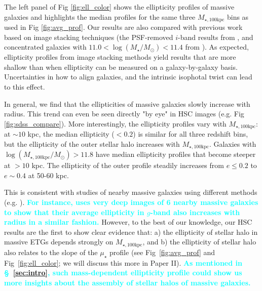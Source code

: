 \documentclass[a4paper,fleqn,usenatbib]{mnras}
\def\logms{{$\log (M_{\star}/M_{\odot})$}}
\def\mtot{{$M_{\star,100\mathrm{kpc}}$}}
\def\logmtot{{$\log (M_{\star,100\mathrm{kpc}}/M_{\odot})$}}
\def\mden{{$\mu_{\star}$}}
\newcommand{\song}[1]{\textcolor{cyan}{\textbf{#1}}}
\begin{document}
	The left panel of Fig \ref{fig:ell_color} shows the ellipticity profiles of 
	massive galaxies and highlights the median profiles for the same three \mtot{} 
	bins as used in Fig \ref{fig:avg_prof}.  
	Our results are also compared with previous work based on image stacking techniques 
	(the PSF-removed $i$-band results from \citealt{Tal2011}, and
    concentrated galaxies with $11.0<$\logms{}$<11.4$ from \citealt{DSouza2015}).
	As expected, ellipticity profiles from image stacking methods yield results that 
	are more shallow than when ellipticity can be measured on a galaxy-by-galaxy basis.     
	Uncertainties in how to align galaxies, and the intrinsic isophotal twist can 
	lead to this effect. 

	In general, we find that the ellipticities of massive galaxies slowly increase 
	with radius. 
	This trend can even be seen directly "by eye" in HSC images (e.g. 
	Fig \ref{fig:sdss_compare}). 
	More interestingly, the ellipticity profiles vary with \mtot{}: 
	at ${\sim} 10$ kpc, the median ellipticity ($< 0.2$) is similar for all three 
	redshift bins, but the ellipticity of the outer stellar halo increases with 
	\mtot{}. 
	Galaxies with \logmtot{}$>11.8$ have median ellipticity profiles that become 
	steeper at $>10$ kpc. 
	The ellipticity of the outer profile steadily increases from 
	$e\le 0.2$ to $e{\sim} 0.4$ at 50-60 kpc.
    
	This is consistent with studies of nearby massive galaxies using different
	methods (e.g. \citep{Porter1991, Gonzalez2005, Zibetti2005, Huang2013a, Oh2017}). 
	\song{
	For instance, \citet{Spavone2017} uses very deep images of 6 nearby massive 
	galaxies to show that their average ellipticity in $g$-band also increases with 
	radius in a similar fashion.
	}
	However, to the best of our knowledge, our HSC results are the first to show 
	clear evidence that:  
	a) the ellipticity of stellar halo in massive ETGs depends strongly on 
	\mtot{}, and 
	b) the ellipticity of stellar halo also relates to the slope of the \mden{}
	profile (see Fig~\ref{fig:avg_prof} and Fig~\ref{fig:ell_color}; 
	we will discuss this more in Paper II). 
	\song{
	As mentioned in \S~\ref{sec:intro}, such mass-dependent ellipticity profile
	could show us more insights about the assembly of stellar halos of massive
	galaxies. 
	}
    
\end{document}
